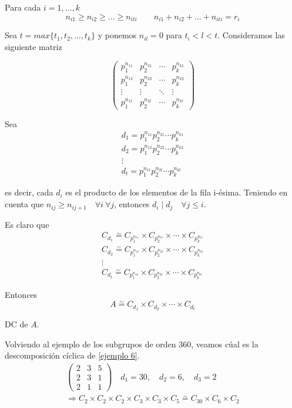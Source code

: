 \documentclass{article}
\begin{document}
Para cada $i=1,\ldots,k$
\begin{equation*}
n_{i1}\geq n_{i2}\geq \ldots \geq n_{iti}\qquad n_{i1}+n_{i2}+\ldots + n_{iti}=r_i
\end{equation*}

Sea $t=max\{t_1,t_2,\ldots,t_k\}$ y ponemos $n_{il}=0$ para $t_i<l<t$. Consideramos las siguiente matriz

\begin{equation*}
\begin{pmatrix}
p_1^{n_{11}}&p_2^{n_{21}}&\cdots&p_k^{n_{k1}}\\
p_1^{n_{12}}&p_2^{n_{22}}&\cdots&p_k^{n_{k2}}\\
\vdots&\vdots&\ddots&\vdots\\
p_1^{n_{1t}}&p_2^{n_{2t}}&\cdots&p_k^{n_{kt}}
\end{pmatrix}
\end{equation*}

Sea 
\begin{gather*}
d_1=p_1^{n_{11}}p_2^{n_{21}}\cdots p_k^{n_{k1}} \\
d_2=p_1^{n_{12}}p_2^{n_{22}}\cdots p_k^{n_{k2}} \\
\vdots\\
d_t=p_1^{n_{1t}}p_2^{n_{2t}}\cdots p_k^{n_{kt}}
\end{gather*}

es decir, cada $d_i$ es el producto de los elementos de la fila i-ésima. Teniendo en cuenta que $n_{ij}\geq n_{ij+1}\quad \forall i\:\forall j$, entonces $d_i\mid d_j\quad \forall j\leq i$.

Es claro que
\begin{gather*}
C_{d_1}\overset{\sim}{=}C_{p_1^{n_{11}}}\times C_{p_2^{n_{21}}}\times \cdots \times C_{p_k^{n_{k1}}} \\
C_{d_2}\overset{\sim}{=}C_{p_1^{n_{12}}}\times C_{p_2^{n_{22}}}\times \cdots \times C_{p_k^{n_{k2}}} \\
\vdots \\
C_{d_t}\overset{\sim}{=}C_{p_1^{n_{1k}}}\times C_{p_2^{n_{2k}}}\times \cdots \times C_{p_k^{n_{kt}}}
\end{gather*} 

Entonces 
\begin{equation*}
A\overset{\sim}{=}C_{d_1}\times C_{d_2}\times \cdots \times C_{d_t}
\end{equation*}

DC de $A$. 

Volviendo al ejemplo de los subgrupos de orden 360, veamos cúal es la descomposición cíclica de \ref{ejemplo 6}.
\begin{gather*}
\begin{pmatrix}
2&3&5\\
2&3&1\\
2&1&1
\end{pmatrix}
\quad d_1=30,\quad d_2=6,\quad d_3=2 \\
\Rightarrow C_2\times C_2\times C_2\times C_3\times C_3\times C_5\overset{\sim}{=} C_{30}\times C_6\times C_2
\end{gather*}
\end{document}

